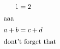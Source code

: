\documentclass{article}
\begin{document}
\begin{align}
1 &=2\\
\intertext{aaa}
a+b&=c+d\\
\intertext{dont't forget that}
\end{align}
\end{document}
